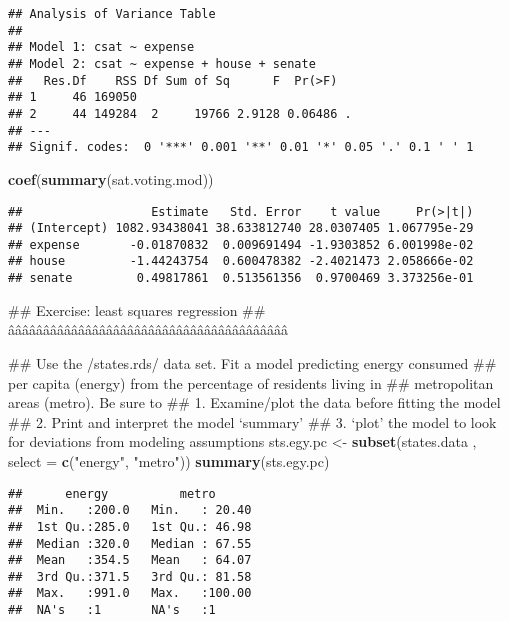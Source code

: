 \documentclass[]{article}
\newenvironment{Shaded}{\begin{snugshade}}{\end{snugshade}}
\newcommand{\KeywordTok}[1]{\textcolor[rgb]{0.13,0.29,0.53}{\textbf{#1}}}
\newcommand{\DataTypeTok}[1]{\textcolor[rgb]{0.13,0.29,0.53}{#1}}
\newcommand{\StringTok}[1]{\textcolor[rgb]{0.31,0.60,0.02}{#1}}
\newcommand{\NormalTok}[1]{#1}
\begin{document}
\begin{verbatim}
## Analysis of Variance Table
## 
## Model 1: csat ~ expense
## Model 2: csat ~ expense + house + senate
##   Res.Df    RSS Df Sum of Sq      F  Pr(>F)  
## 1     46 169050                              
## 2     44 149284  2     19766 2.9128 0.06486 .
## ---
## Signif. codes:  0 '***' 0.001 '**' 0.01 '*' 0.05 '.' 0.1 ' ' 1
\end{verbatim}

\begin{Shaded}
\begin{Highlighting}[]
\KeywordTok{coef}\NormalTok{(}\KeywordTok{summary}\NormalTok{(sat.voting.mod))}
\end{Highlighting}
\end{Shaded}

\begin{verbatim}
##                  Estimate   Std. Error    t value     Pr(>|t|)
## (Intercept) 1082.93438041 38.633812740 28.0307405 1.067795e-29
## expense       -0.01870832  0.009691494 -1.9303852 6.001998e-02
## house         -1.44243754  0.600478382 -2.4021473 2.058666e-02
## senate         0.49817861  0.513561356  0.9700469 3.373256e-01
\end{verbatim}

\begin{Shaded}
\begin{Highlighting}[]
\NormalTok{## Exercise: least squares regression}
\NormalTok{## ââââââââââââââââââââââââââââââââââââââââ}

\NormalTok{##   Use the /states.rds/ data set. Fit a model predicting energy consumed}
\NormalTok{##   per capita (energy) from the percentage of residents living in}
\NormalTok{##   metropolitan areas (metro). Be sure to}
\NormalTok{##   1. Examine/plot the data before fitting the model}
\NormalTok{##   2. Print and interpret the model `summary'}
\NormalTok{##   3. `plot' the model to look for deviations from modeling assumptions}
\NormalTok{sts.egy.pc <-}\StringTok{  }\KeywordTok{subset}\NormalTok{(states.data , }\DataTypeTok{select =} \KeywordTok{c}\NormalTok{(}\StringTok{"energy"}\NormalTok{, }\StringTok{"metro"}\NormalTok{))}
\KeywordTok{summary}\NormalTok{(sts.egy.pc)}
\end{Highlighting}
\end{Shaded}

\begin{verbatim}
##      energy          metro       
##  Min.   :200.0   Min.   : 20.40  
##  1st Qu.:285.0   1st Qu.: 46.98  
##  Median :320.0   Median : 67.55  
##  Mean   :354.5   Mean   : 64.07  
##  3rd Qu.:371.5   3rd Qu.: 81.58  
##  Max.   :991.0   Max.   :100.00  
##  NA's   :1       NA's   :1
\end{verbatim}
\end{document}
